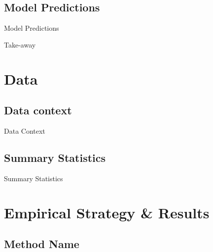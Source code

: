 \documentclass[10pt]{beamer}
\begin{document}
\subsection{Model Predictions}
\begin{frame}{Model Predictions}
\end{frame}


\begin{frame}{Take-away}
\end{frame}





\section{Data}

\subsection{Data context}

\begin{frame}{Data Context}
\linespread{1.5}
\end{frame}


\subsection{Summary Statistics}
\begin{frame}{Summary Statistics}

\end{frame}



\section{Empirical Strategy \& Results}

\subsection{Method Name}
\end{document}
